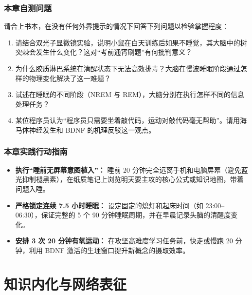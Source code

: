 \documentclass[12pt,a4paper,openany]{ctexbook}
\begin{document}
\section*{本章自测问题}
请合上书本，在没有任何外界提示的情况下回答下列问题以检验掌握程度：
\begin{enumerate}
    \item 请结合双光子显微镜实验，说明小鼠在白天训练后如果不睡觉，其大脑中的树突棘会发生什么变化？这对“考前通宵刷题”有何批判意义？
    \item 为什么胶质淋巴系统在清醒状态下无法高效排毒？大脑在慢波睡眠阶段通过怎样的物理变化解决了这一难题？
    \item 试述在睡眠的不同阶段（NREM 与 REM），大脑分别在执行怎样不同的信息处理任务？
    \item 某位程序员认为“程序员只需要坐着敲代码，运动对敲代码毫无帮助”。请用海马体神经发生和 BDNF 的机理反驳这一观点。
\end{enumerate}

\section*{本章实践行动指南}
\begin{practicebox}[本周神经维护行动方案]
\begin{itemize}
    \item[$\square$] \textbf{执行“睡前无屏幕意图植入”：} 睡前 20 分钟完全远离手机和电脑屏幕（避免蓝光抑制褪黑素），在纸质笔记上浏览明天要主攻的核心公式或知识地图，带着问题入睡。

    \item[$\square$] \textbf{严格锁定连续 7.5 小时睡眠：} 设定固定的熄灯和起床时间（如 23:00--06:30），保证完整的 5 个 90 分钟睡眠周期，并在早晨记录头脑的清醒度变化。

    \item[$\square$] \textbf{安排 3 次 20 分钟有氧运动：} 在攻坚高难度学习任务前，快走或慢跑 20 分钟，利用 BDNF 激活的生理窗口提升新概念的摄取效率。
\end{itemize}
\end{practicebox}

\part{知识内化与网络表征}
\end{document}
